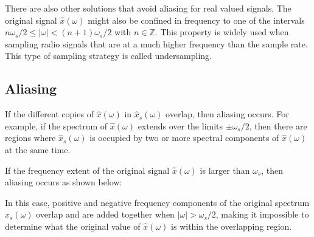 There are also other solutions that avoid aliasing for real valued signals. The original signal $\hat{x}(\omega)$ might also be confined in frequency to one of the intervals $n \omega_s/2 \le |\omega| < (n+1)\omega_s/2$ with $n\in\mathbb{Z}$. This property is widely used when sampling radio signals that are at a much higher frequency than the sample rate. This type of sampling strategy is called undersampling.

\subsection{Aliasing}
If the different copies of $\hat{x}(\omega)$ in $\hat{x}_s(\omega)$ overlap, then aliasing occurs. For example, if the spectrum of $\hat{x}(\omega)$ extends over the limits $\pm \omega_s/2$, then there are regions where $\hat{x}_s(\omega)$ is occupied by two or more spectral components of $\hat{x}(\omega)$ at the same time.

If the frequency extent of the original signal $\hat{x}(\omega)$ is larger than $\omega_s$, then aliasing occurs as shown below:
\begin{center}
\end{center}
In this case, positive and negative frequency components of the original spectrum $\hat{x}_s(\omega)$ overlap and are added together when $|\omega| > \omega_s/2$, making it impossible to determine what the original value of $\hat{x}(\omega)$ is within the overlapping region.

